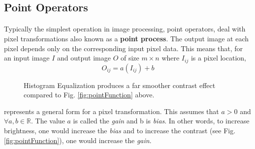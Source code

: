 \documentclass[11pt]{article}
\newcommand\simpleparagraph[1]{%
	\stepcounter{paragraph}\paragraph*{\theparagraph\quad{}#1}}
\renewcommand\theparagraph{}
\begin{document}
\subsection{Point Operators}
\simpleparagraph{}
Typically the simplest operation in image processing, point operators, deal with pixel transformations also known as a \textbf{point process}\label{point process}. The output image at each pixel depends only on the corresponding input pixel data. This means that, for an input image $I$ and output image $O$ of size $m\times n$ where $I_{ij}$ is a pixel location,
\begin{equation}\label{equ:PToper}
	O_{ij} = a(I_{ij})+b
\end{equation}

\begin{figure}
	\hfill
	\caption{Histogram Equalization produces a far smoother contrast effect compared to Fig. \ref{fig:pointFunction} above.}
	\label{fig:histrEquTxt}
\end{figure}
represents a general form for a pixel transformation. This assumes that $a>0$ and $\forall a,b \in \mathbb{R}$. The value $a$ is called the \textit{gain} and b is \textit{bias}. In other words, to increase brightness, one would increase the \textit{bias} and to increase the contrast (see Fig. \ref{fig:pointFunction}), one would increase the \textit{gain}.
\end{document}
